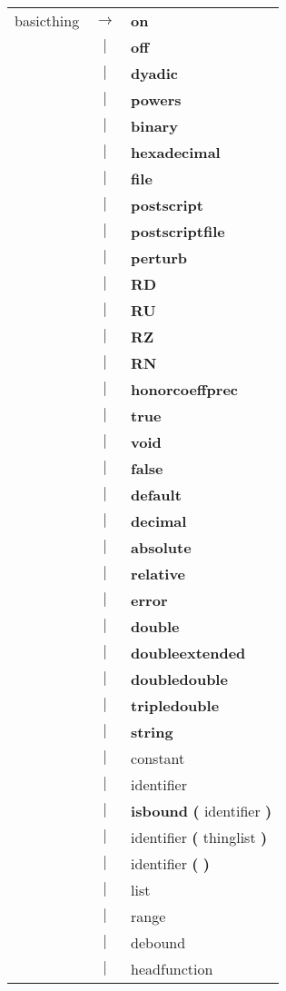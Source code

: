 \begin{tabular}{lcl}
basicthing & $\rightarrow$ & \textbf{on} \\
 & $|$ & \textbf{off} \\
 & $|$ & \textbf{dyadic} \\
 & $|$ & \textbf{powers} \\
 & $|$ & \textbf{binary} \\
 & $|$ & \textbf{hexadecimal} \\
 & $|$ & \textbf{file} \\
 & $|$ & \textbf{postscript} \\
 & $|$ & \textbf{postscriptfile} \\
 & $|$ & \textbf{perturb} \\
 & $|$ & \textbf{RD} \\
 & $|$ & \textbf{RU} \\
 & $|$ & \textbf{RZ} \\
 & $|$ & \textbf{RN} \\
 & $|$ & \textbf{honorcoeffprec} \\
 & $|$ & \textbf{true} \\
 & $|$ & \textbf{void} \\
 & $|$ & \textbf{false} \\
 & $|$ & \textbf{default} \\
 & $|$ & \textbf{decimal} \\
 & $|$ & \textbf{absolute} \\
 & $|$ & \textbf{relative} \\
 & $|$ & \textbf{error} \\
 & $|$ & \textbf{double} \\
 & $|$ & \textbf{doubleextended} \\
 & $|$ & \textbf{doubledouble} \\
 & $|$ & \textbf{tripledouble} \\
 & $|$ & \textbf{string} \\
 & $|$ & constant \\
 & $|$ & identifier \\
 & $|$ & \textbf{isbound} \textbf{(} identifier \textbf{)} \\
 & $|$ & identifier \textbf{(} thinglist \textbf{)} \\
 & $|$ & identifier \textbf{(} \textbf{)} \\
 & $|$ & list \\
 & $|$ & range \\
 & $|$ & debound \\
 & $|$ & headfunction \\

\end{tabular}
